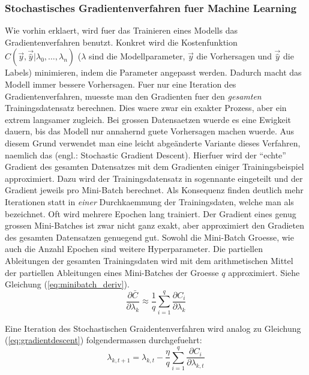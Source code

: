 \documentclass[../main]{subfiles}
\begin{document}
\subsubsection{Stochastisches Gradientenverfahren fuer Machine Learning}
Wie vorhin erklaert, wird fuer das Trainieren eines Modells das Gradientenverfahren benutzt.
Konkret wird die Kostenfunktion $C(\vec{y},\vec{\hat{y}}|\lambda_0,\ldots,\lambda_n)$
($\lambda$ sind die Modellparameter, $\vec{y}$ die Vorhersagen und $\vec{\hat{y}}$
die Labels) minimieren, indem die Parameter angepasst werden. Dadurch macht das Modell immer bessere Vorhersagen.
Fuer nur eine Iteration des Gradientenverfahren, muesste man den Gradienten fuer den
\textit{gesamten} Trainingsdatensatz berechnen.
Dies waere zwar ein exakter Prozess, aber ein extrem langsamer zugleich.
Bei grossen Datensaetzen wuerde es eine Ewigkeit dauern, bis das Modell nur annahernd guete Vorhersagen machen wuerde.
\para
Aus diesem Grund verwendet man eine leicht abgeänderte Variante dieses Verfahren, naemlich das  (engl.: Stochastic Gradient Descent).
Hierfuer wird der ``echte'' Gradient des gesamten Datensatzes mit dem Gradienten einiger Trainingsbeispiel approximiert.
Dazu wird der Trainingsdatensatz in sogennante  eingeteilt und der Gradient jeweils pro Mini-Batch berechnet.
Als Konsequenz finden deutlich mehr Iterationen statt in \textit{einer}
Durchkaemmung der Trainingsdaten, welche man als  bezeichnet. Oft wird mehrere Epochen lang trainiert.
Der Gradient eines genug grossen Mini-Batches ist zwar nicht ganz exakt, aber approximiert den Gradieten des gesamten Datensatzen genuegend gut.
Sowohl die Mini-Batch Groesse, wie auch die Anzahl Epochen sind weitere Hyperparameter.
\para
Die partiellen Ableitungen der gesamten Trainingsdaten wird mit dem arithmetischen Mittel der partiellen Ableitungen eines Mini-Batches der Groesse $q$ approximiert. Siehe Gleichung (\ref{eq:minibatch_deriv}).
\begin{equation}\label{eq:minibatch_deriv}
  \frac{\partial\bar{C}}{\partial\lambda_k} \approx \frac{1}{q}\sum_{i=1}^{q} \frac{\partial C_i}{\partial\lambda_k}
\end{equation}

Eine Iteration des Stochastischen Graidentenverfahren wird analog zu Gleichung (\ref{eq:gradientdescent}) folgendermassen durchgefuehrt:
\begin{equation}\label{eq:sgd}
  \lambda_{k,t+1} = \lambda_{k,t} - \frac{\eta}{q} \sum_{i=1}^{q} \frac{\partial C_i}{\partial \lambda_{k,t}}
\end{equation}
\end{document}
